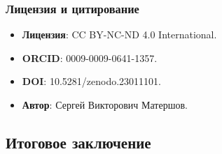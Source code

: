 \documentclass[11pt,a4paper]{article}
\theoremstyle{definition}
\begin{document}
\subsubsection{Лицензия и цитирование}

\begin{itemize}
    \item \textbf{Лицензия}: CC BY-NC-ND 4.0 International.
    \item \textbf{ORCID}: 0009-0009-0641-1357.
    \item \textbf{DOI}: 10.5281/zenodo.23011101.
    \item \textbf{Автор}: Сергей Викторович Матершов.
\end{itemize}

\subsection{Итоговое заключение}
\label{subsec:conclusions-final}
\end{document}

